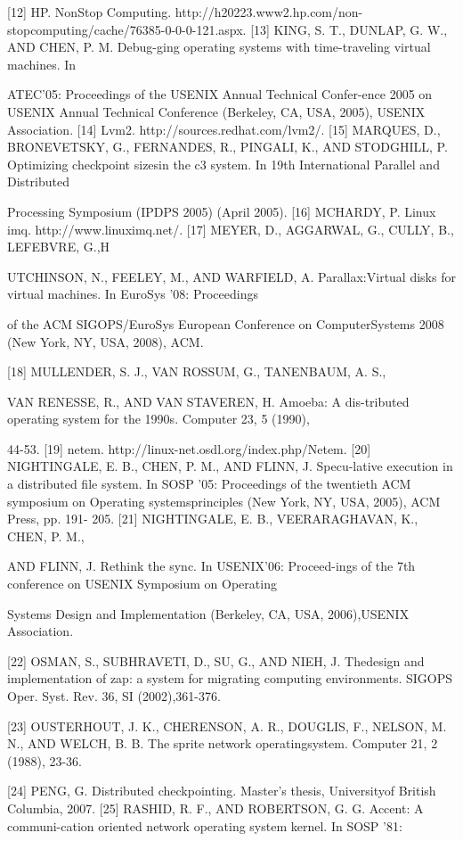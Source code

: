 [12] HP. NonStop Computing. http://h20223.www2.hp.com/non-stopcomputing/cache/76385-0-0-0-121.aspx.
[13] KING, S. T., DUNLAP, G. W., AND CHEN, P. M. Debug-ging operating systems with time-traveling virtual machines. In

ATEC'05: Proceedings of the USENIX Annual Technical Confer-ence 2005 on USENIX Annual Technical Conference (Berkeley,
CA, USA, 2005), USENIX Association.
[14] Lvm2. http://sources.redhat.com/lvm2/.
[15] MARQUES, D., BRONEVETSKY, G., FERNANDES, R., PINGALI, K., AND STODGHILL, P. Optimizing checkpoint sizesin the c3 system. In 19th International Parallel and Distributed

Processing Symposium (IPDPS 2005) (April 2005).
[16] MCHARDY, P. Linux imq. http://www.linuximq.net/.
[17] MEYER, D., AGGARWAL, G., CULLY, B., LEFEBVRE, G.,H

UTCHINSON, N., FEELEY, M., AND WARFIELD, A. Parallax:Virtual disks for virtual machines. In EuroSys '08: Proceedings

of the ACM SIGOPS/EuroSys European Conference on ComputerSystems 2008 (New York, NY, USA, 2008), ACM.

[18] MULLENDER, S. J., VAN ROSSUM, G., TANENBAUM, A. S.,

VAN RENESSE, R., AND VAN STAVEREN, H. Amoeba: A dis-tributed operating system for the 1990s. Computer 23, 5 (1990),

44-53.
[19] netem. http://linux-net.osdl.org/index.php/Netem.
[20] NIGHTINGALE, E. B., CHEN, P. M., AND FLINN, J. Specu-lative execution in a distributed file system. In SOSP '05: Proceedings of the twentieth ACM symposium on Operating systemsprinciples (New York, NY, USA, 2005), ACM Press, pp. 191-
205.
[21] NIGHTINGALE, E. B., VEERARAGHAVAN, K., CHEN, P. M.,

AND FLINN, J. Rethink the sync. In USENIX'06: Proceed-ings of the 7th conference on USENIX Symposium on Operating

Systems Design and Implementation (Berkeley, CA, USA, 2006),USENIX Association.

[22] OSMAN, S., SUBHRAVETI, D., SU, G., AND NIEH, J. Thedesign and implementation of zap: a system for migrating computing environments. SIGOPS Oper. Syst. Rev. 36, SI (2002),361-376.

[23] OUSTERHOUT, J. K., CHERENSON, A. R., DOUGLIS, F., NELSON, M. N., AND WELCH, B. B. The sprite network operatingsystem. Computer 21, 2 (1988), 23-36.

[24] PENG, G. Distributed checkpointing. Master's thesis, Universityof British Columbia, 2007.
[25] RASHID, R. F., AND ROBERTSON, G. G. Accent: A communi-cation oriented network operating system kernel. In SOSP '81:

